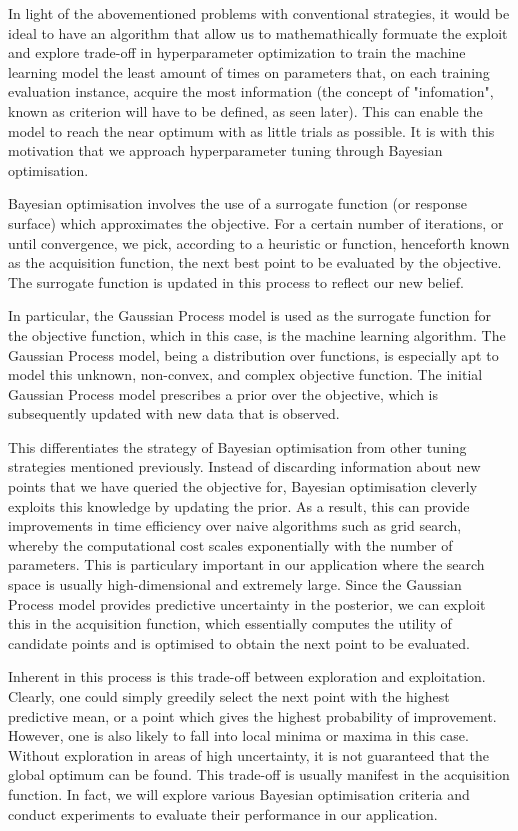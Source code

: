 \documentclass[letterpaper]{article}
\begin{document}
In light of the abovementioned problems with conventional strategies, it would be ideal
to have an algorithm that allow us to mathemathically formuate the exploit and explore
trade-off in hyperparameter optimization to train the machine learning model the least
amount of times on parameters that, on each training evaluation instance, acquire the
most information (the concept of "infomation", known as criterion will have to be defined,
as seen later). This can enable the model to reach the near optimum with as little trials as possible.
It is with this motivation that we approach hyperparameter tuning through Bayesian optimisation.

Bayesian optimisation involves the use of a surrogate function (or response surface)
which approximates the objective. For a certain number of iterations, or until
convergence, we pick, according to a heuristic or function, henceforth known as the
acquisition function, the next best point to be evaluated by the objective. The
surrogate function is updated in this process to reflect our new belief.

In particular, the Gaussian Process model is used as the surrogate function
for the objective function, which in this case, is the machine learning algorithm.
The Gaussian Process model, being a distribution over functions, is especially apt
to model this unknown, non-convex, and complex objective function. The
initial Gaussian Process model prescribes a prior over the objective, which is
subsequently updated with new data that is observed.

This differentiates the strategy of Bayesian optimisation from other tuning
strategies mentioned previously. Instead of discarding information about new points
that we have queried the objective for, Bayesian optimisation cleverly exploits this
knowledge by updating the prior. As a result, this can provide improvements in time
efficiency over naive algorithms such as grid search, whereby the computational
cost scales exponentially with the number of parameters.  This is particulary
important in our application where the search space is usually high-dimensional
and extremely large. Since the Gaussian Process model provides predictive uncertainty
in the posterior, we can exploit this in the acquisition function, which essentially
computes the utility of candidate points and is optimised to obtain the next point
to be evaluated.

Inherent in this process is this trade-off between exploration and exploitation.
Clearly, one could simply greedily select the next point with the highest predictive
mean, or a point which gives the highest probability of improvement. However, one
is also likely to fall into local minima or maxima in this case. Without exploration
in areas of high uncertainty, it is not guaranteed that the global optimum can be
found. This trade-off is usually manifest in the acquisition function. In fact,
we will explore various Bayesian optimisation criteria and conduct experiments to
evaluate their performance in our application.
\end{document}
